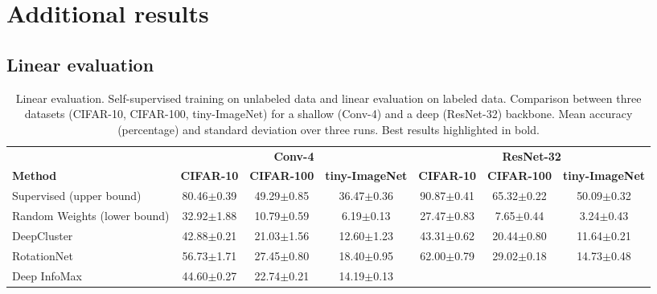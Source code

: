 \documentclass{article}
\begin{document}
\section{Additional results}\label{appendix:additional_results}
\FloatBarrier

\subsection{Linear evaluation}\label{appendix:additional_linear_evaluation}

\begin{table}[H]
 \caption{Linear evaluation. Self-supervised training on unlabeled data and linear evaluation on labeled data. Comparison between three datasets (CIFAR-10, CIFAR-100, tiny-ImageNet) for a shallow (Conv-4) and a deep (ResNet-32) backbone. Mean accuracy (percentage) and standard deviation over three runs. Best results highlighted in bold.}
 \label{tab:linear_evaluation}
 \begin{adjustbox}{width=\columnwidth,center}
  \centering
  \begin{tabular}{lcccccc}
    \toprule
     & \multicolumn{3}{c}{\textbf{Conv-4}} & \multicolumn{3}{c}{\textbf{ResNet-32}} \\
    \cmidrule[0.1pt](r){2-4} \cmidrule[0.1pt](l){5-7}
    \textbf{Method} &
    \textbf{CIFAR-10} & \textbf{CIFAR-100} & \textbf{tiny-ImageNet} &
    \textbf{CIFAR-10} & \textbf{CIFAR-100} & \textbf{tiny-ImageNet} \\
    \midrule
    Supervised (upper bound) & 
    80.46$\pm$\small{0.39} & 49.29$\pm$\small{0.85}  & 36.47$\pm$\small{0.36} &
    90.87$\pm$\small{0.41} & 65.32$\pm$\small{0.22}  & 50.09$\pm$\small{0.32} \\
    Random Weights (lower bound) & 
    32.92$\pm$\small{1.88} & 10.79$\pm$\small{0.59}  & 6.19$\pm$\small{0.13} &
    27.47$\pm$\small{0.83} &  7.65$\pm$\small{0.44}  & 3.24$\pm$\small{0.43} \\
    \cmidrule(l){1-7}
    DeepCluster \citep{caron2018deep} & 
    42.88$\pm$\small{0.21} & 21.03$\pm$\small{1.56}  & 12.60$\pm$\small{1.23} &
    43.31$\pm$\small{0.62} & 20.44$\pm$\small{0.80}  & 11.64$\pm$\small{0.21} \\
    RotationNet \citep{gidaris2018unsupervised} & 
    56.73$\pm$\small{1.71} & 27.45$\pm$\small{0.80}  & 18.40$\pm$\small{0.95} &
    62.00$\pm$\small{0.79} & 29.02$\pm$\small{0.18}  & 14.73$\pm$\small{0.48} \\
    Deep InfoMax \citep{hjelm2018learning} & 
    44.60$\pm$\small{0.27} & 22.74$\pm$\small{0.21}  & 14.19$\pm$\small{0.13} &

\end{tabular}
\end{adjustbox}
\end{table}
\end{document}
